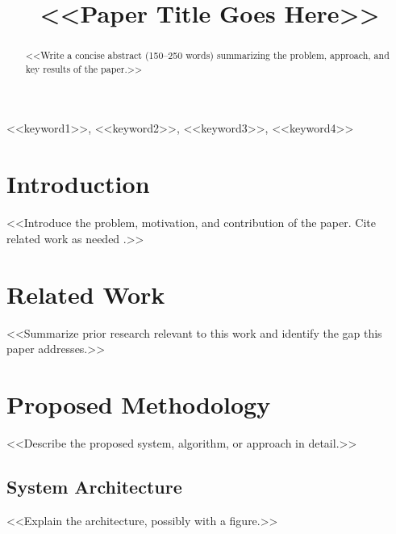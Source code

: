 \documentclass[conference]{IEEEtran}
\begin{document}
\title{<<Paper Title Goes Here>>\\
{\footnotesize \textsuperscript{}}
}

\author{
\and
{}
}

\maketitle

\begin{abstract}
<<Write a concise abstract (150--250 words) summarizing the problem, approach, and key results of the paper.>>
\end{abstract}

\begin{IEEEkeywords}
<<keyword1>>, <<keyword2>>, <<keyword3>>, <<keyword4>>
\end{IEEEkeywords}

\section{Introduction}
<<Introduce the problem, motivation, and contribution of the paper. Cite related work as needed \cite{ref1}.>>

\section{Related Work}
<<Summarize prior research relevant to this work and identify the gap this paper addresses.>>

\section{Proposed Methodology}
<<Describe the proposed system, algorithm, or approach in detail.>>

\subsection{System Architecture}
<<Explain the architecture, possibly with a figure.>>
\end{document}
